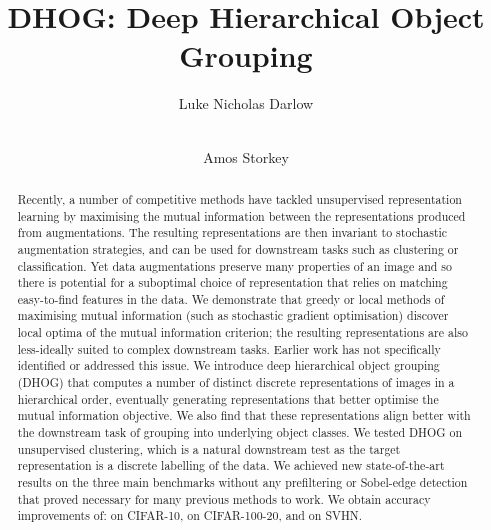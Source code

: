 \documentclass[runningheads]{llncs}
\begin{document}
\pagestyle{headings}
\mainmatter
\def\ECCVSubNumber{5113}  

\title{DHOG: Deep Hierarchical Object Grouping} 

\begin{comment}
\titlerunning{ECCV-20 submission ID \ECCVSubNumber} 
\authorrunning{ECCV-20 submission ID \ECCVSubNumber} 
\author{Anonymous ECCV submission}
\institute{Paper ID \ECCVSubNumber}
\end{comment}


\author{
Luke Nicholas Darlow \\
{}\\
\and
Amos Storkey \\
}
{}


\maketitle
\begin{abstract}
Recently, a number of competitive methods have tackled unsupervised representation learning by maximising the mutual information between the representations produced from augmentations. The resulting representations are then invariant to stochastic augmentation strategies, and can be used for downstream tasks such as clustering or classification. Yet data augmentations preserve many properties of an image and so there is potential for a suboptimal choice of representation that relies on matching easy-to-find features in the data. We demonstrate that greedy or local methods of maximising mutual information (such as stochastic gradient optimisation) discover local optima of the mutual information criterion; the resulting representations are also less-ideally suited to complex downstream tasks. Earlier work has not specifically identified or addressed this issue. We introduce deep hierarchical object grouping (DHOG) that computes a number of distinct discrete representations of images in a hierarchical order, eventually generating representations that better optimise the mutual information objective. We also find that these representations align better with the downstream task of grouping into underlying object classes. We tested DHOG on unsupervised clustering, which is a natural downstream test as the target representation is a discrete labelling of the data. We achieved new state-of-the-art results on the three main benchmarks without any prefiltering or Sobel-edge detection that proved necessary for many previous methods to work. We obtain accuracy improvements of:  on CIFAR-10,  on CIFAR-100-20, and  on SVHN.
\end{abstract}
\end{document}
